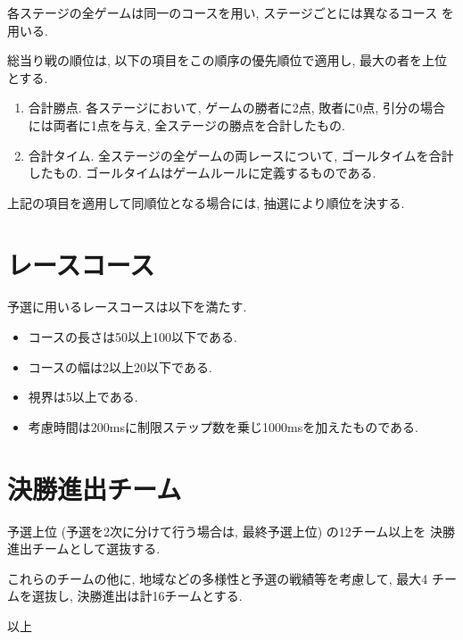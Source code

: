 \documentclass[11pt]{jarticle}
\begin{document}
各ステージの全ゲームは同一のコースを用い, ステージごとには異なるコース
を用いる.

総当り戦の順位は, 以下の項目をこの順序の優先順位で適用し, 最大の者を上位とする.
\begin{enumerate}
\item
  合計勝点.
  各ステージにおいて, ゲームの勝者に2点, 敗者に0点, 引分の場合には両者に1点を与え,
  全ステージの勝点を合計したもの.
\item
  合計タイム.
  全ステージの全ゲームの両レースについて, ゴールタイムを合計したもの.
  ゴールタイムはゲームルールに定義するものである.
\end{enumerate}
上記の項目を適用して同順位となる場合には, 抽選により順位を決する.

\section{レースコース}
予選に用いるレースコースは以下を満たす.
\begin{itemize}
\item コースの長さは50以上100以下である.
\item コースの幅は2以上20以下である.
\item 視界は5以上である.
\item 考慮時間は200msに制限ステップ数を乗じ1000msを加えたものである.
\end{itemize}

\section{決勝進出チーム}
予選上位 (予選を2次に分けて行う場合は, 最終予選上位) の12チーム以上を
決勝進出チームとして選抜する.

これらのチームの他に, 地域などの多様性と予選の戦績等を考慮して, 最大4
チームを選抜し, 決勝進出は計16チームとする.

\begin{flushright}
以上
\end{flushright}
\end{document}
